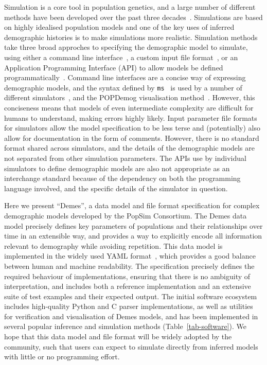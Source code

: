 \documentclass[11pt]{article}
\newcommand{\ms}[0]{\texttt{ms}}
\begin{document}
Simulation is a core tool in population genetics, and a
large number of different methods have been developed
over the past three decades~\citep{carvajal2008simulation,liu2008survey,
arenas2012simulation,yuan2012overview,hoban2012computer}.
Simulations are based on highly idealised population models
and one of the key uses of inferred demographic histories
is to make simulations more realistic.
Simulation methods take three broad approches to specifying
the demographic model to simulate,
using either a command line
interface~\citep[e.g.][]{hudson2002generating,kern2016discoal},
a custom input file
format~\citep[e.g.][]{guillaume2006nemo,excoffier2011fastsimcoal,shlyakhter2014cosi2},
or an Application Programming Interface (API) to allow
models be defined programmatically~\citep[e.g.][]{
thornton2014cpp,kelleher2016efficient,becheler2019quetzal,haller2019slim}.
Command line interfaces are a concise way of expressing
demographic models, and the syntax defined by \ms~\citep{hudson2002generating}
is used by a number of different
simulators~\citep[e.g.][]{ewing2010msms,chen2009fast,staab2015scrm},
and the POPDemog visualisation method~\citep{zhou2018popdemog}.
However, this conciseness means that models of even intermediate complexity
are difficult for humans to understand, making errors highly likely.
Input parameter file formats for simulators allow the model specification
to be less terse and (potentially) also allow for documentation in the
form of comments. However, there is no standard format shared across
simulators, and the details of the demographic models are not separated
from other simulation parameters. The APIs use by individual simulators
to define demographic models are also not appropriate as an interchange
standard because of the dependency on both the programming language involved,
and the specific details of the simulator in question.

Here we present ``Demes'', a data model and file format
specification for complex demographic models developed by the PopSim
Consortium. The Demes data model precisely defines key parameters
of populations and their relationships over time in an extensible way,
and provides a way to explicitly encode all information relevant to
demography while avoiding repetition. This data model is implemented
in the widely used YAML format~\citep{ben2009yaml}, which provides a
good balance between human and machine readability.
The specification precisely
defines the required behaviour of implementations, ensuring that there
is no ambiguity of interpretation, and includes both a reference
implementation and an extensive suite of test examples and their expected
output. The initial software ecosystem includes high-quality
Python and C parser implementations, as well as utilities for verification
and visualisation of Demes models, and has been implemented in
several popular inference and simulation methods
(Table~\ref{tab-software}).
We hope that this
data model and file format will be widely adopted by the community,
such that users can expect to simulate directly from
inferred models with little or no programming effort.
\end{document}
